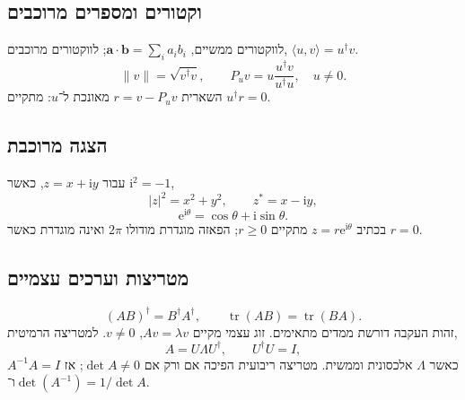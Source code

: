 \makereferencetitle
\begin{referencecolumns}
\begin{referenceentry}
\section{וקטורים ומספרים מרוכבים}
לווקטורים ממשיים, $\mathbf a\cdot\mathbf b=\sum_i a_i b_i$; לווקטורים מרוכבים,
$\langle u,v\rangle=u^\dagger v$.
\[
\|v\|=\sqrt{v^\dagger v},\qquad
P_u v=u\frac{u^\dagger v}{u^\dagger u},\quad u\neq0.
\]
השארית $r=v-P_u v$ מאונכת ל־$u$: מתקיים $u^\dagger r=0$.
\subsection{הצגה מרוכבת}
עבור $z=x+\mathrm i y$, כאשר $\mathrm i^2=-1$,
\[
|z|^2=x^2+y^2,\qquad z^*=x-\mathrm i y,
\]
\[
\mathrm e^{\mathrm i\theta}=\cos\theta+\mathrm i\sin\theta.
\]
בכתיב $z=r\mathrm e^{\mathrm i\theta}$ מתקיים $r\geq0$; הפאזה מוגדרת
מודולו $2\pi$ ואינה מוגדרת כאשר $r=0$.
\end{referenceentry}

\begin{referenceentry}
\section{מטריצות וערכים עצמיים}
\[
(AB)^\dagger=B^\dagger A^\dagger,\qquad
\operatorname{tr}(AB)=\operatorname{tr}(BA).
\]
זהות העקבה דורשת ממדים מתאימים. זוג עצמי מקיים
$Av=\lambda v$, $v\neq0$. למטריצה הרמיטית,
\[
A=U\Lambda U^\dagger,\qquad U^\dagger U=I,
\]
כאשר $\Lambda$ אלכסונית וממשית. מטריצה ריבועית הפיכה אם ורק אם
$\det A\neq0$; אז $A^{-1}A=I$ ו־$\det(A^{-1})=1/\det A$.
\end{referenceentry}

\begin{referenceentry}

\end{referenceentry}
\end{referencecolumns}
